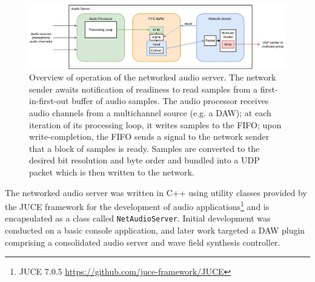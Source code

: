 \documentclass[utf8]{FrontiersinHarvard}
\begin{document}
    \begin{figure}[ht]
        \centering
        \includegraphics[width=\textwidth]{figures/audio-server}
        \caption{Overview of operation of the networked audio server.
        The network sender awaits notification of readiness to read samples from a
        first-in-first-out buffer of audio samples.
        The audio processor receives audio channels from a multichannel source
            (e.g. a DAW); at each iteration of its processing loop, it writes
            samples to the FIFO; upon write-completion, the FIFO sends a signal to
            the network sender that a block of samples is ready.
            Samples are converted to the desired bit resolution and byte order and
            bundled into a UDP packet which is then written to the network.}
        \label{fig:audio-server}
    \end{figure}

    The networked audio server was written in C++ using utility classes provided
    by the JUCE framework for the development of audio applications\footnote{
        JUCE 7.0.5 \url{https://github.com/juce-framework/JUCE}
    }
    and is encapsulated as a class called \texttt{NetAudioServer}.
    Initial development was conducted on a basic console application, and later
    work targeted a DAW plugin comprising a consolidated audio server and wave
    field synthesis controller.
\end{document}
